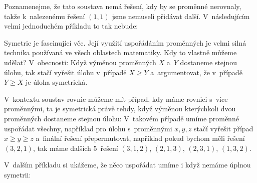 Poznamenejme, že tato soustava nemá řešení, kdy by se proměnné nerovnaly, takže k~nalezenému řešení $(1,1)$ jsme nemuseli přidávat další. V~následujícím velmi jednoduchém příkladu to tak nebude:


Symetrie je fascinující věc. Její využití uspořádáním proměnných je velmi silná technika používaná ve všech oblastech matematiky. Kdy to vlastně můžeme udělat? V~obecnosti: Když výměnou proměnných $X$ a~$Y$ dostaneme stejnou úlohu, tak stačí vyřešit úlohu v~případě $X \ge Y$ a~argumentovat, že v~případě $Y \ge X$ je úloha symetrická. 

V~kontextu soustav rovnic můžeme mít případ, kdy máme rovnici s~více proměnnými, ta je symetrická právě tehdy, když výměnou kterýchkoli dvou proměnných dostaneme stejnou úlohu: V~takovém případě umíme proměnné uspořádat všechny, například pro úlohu s~proměnnými $x,y,z$ stačí vyřešit případ $x \ge y \ge z$ a~finální řešení přepermutovat, například pokud bychom měli řešení $(3,2,1)$, tak máme dalších 5~řešení $(3,1,2)$, $(2,1,3)$, $(2,3,1)$, $(1,3,2)$.

V~dalším příkladu si ukážeme, že něco uspořádat umíme i když nemáme úplnou symetrii:

